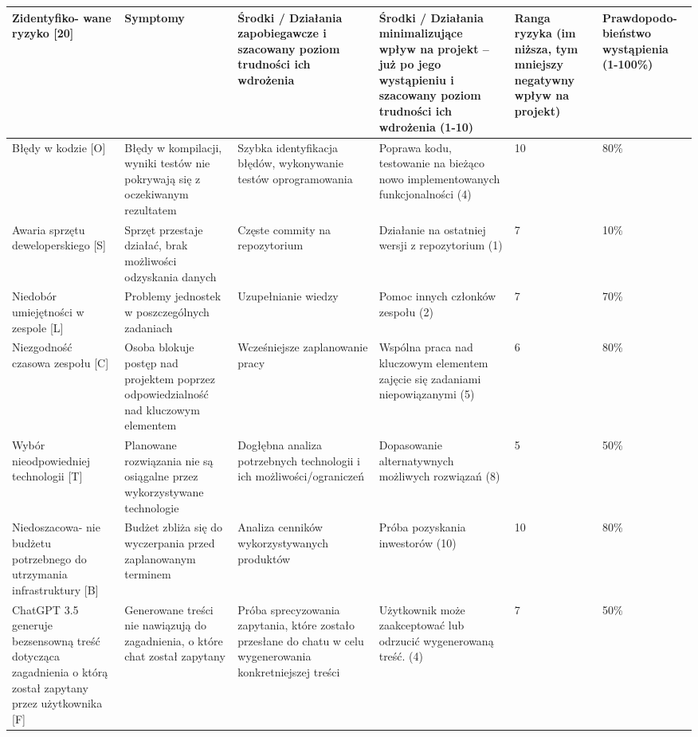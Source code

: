 \begin{longtable}{|p{2.3cm}|p{2.3cm}|p{2.3cm}|p{2.3cm}|p{2.3cm}|p{2.3cm}|}
    \hline
\textbf{Zidentyfiko- wane ryzyko [20]} & \textbf{Symptomy} & \textbf{Środki / Działania zapobiegawcze i szacowany poziom trudności ich wdrożenia} & \textbf{Środki / Działania minimalizujące wpływ na projekt – już po jego wystąpieniu i szacowany poziom trudności ich wdrożenia (1-10)} & \textbf{Ranga ryzyka (im niższa, tym mniejszy negatywny wpływ na projekt)} & \textbf{Prawdopodo- bieństwo wystąpienia (1-100\%)} \\
\hline
Błędy w kodzie [O] & Błędy w kompilacji, wyniki testów nie pokrywają się z oczekiwanym rezultatem  & Szybka identyfikacja błędów, wykonywanie testów oprogramowania & Poprawa kodu, testowanie na bieżąco nowo implementowanych funkcjonalności (4) & 10 & 80\% \\
\hline
Awaria sprzętu deweloperskiego [S] & Sprzęt przestaje działać, brak możliwości odzyskania danych & Częste commity na repozytorium & Działanie na ostatniej wersji z repozytorium (1) & 7 & 10\% \\
\hline
Niedobór umiejętności w zespole [L] & Problemy jednostek w poszczególnych zadaniach & Uzupełnianie wiedzy & Pomoc innych członków zespołu (2) & 7 & 70\% \\
\hline
Niezgodność czasowa zespołu [C]  & Osoba blokuje postęp nad projektem poprzez odpowiedzialność nad kluczowym elementem & Wcześniejsze zaplanowanie pracy & Wspólna praca nad kluczowym elementem zajęcie się zadaniami niepowiązanymi (5) & 6 & 80\% \\
\hline
Wybór nieodpowiedniej technologii [T] & Planowane rozwiązania nie są osiągalne przez wykorzystywane technologie & Dogłębna analiza potrzebnych technologii i ich możliwości/ograniczeń & Dopasowanie alternatywnych możliwych rozwiązań (8) & 5 & 50\% \\
\hline
Niedoszacowa- nie budżetu potrzebnego do utrzymania infrastruktury [B] & Budżet zbliża się do wyczerpania przed zaplanowanym terminem  & Analiza cenników wykorzystywanych produktów & Próba pozyskania inwestorów (10) & 10 & 80\% \\
\hline
ChatGPT 3.5 generuje bezsensowną treść dotycząca zagadnienia o którą został zapytany przez użytkownika [F] & Generowane treści nie nawiązują do zagadnienia, o które chat został zapytany & Próba sprecyzowania zapytania, które zostało przesłane do chatu w celu wygenerowania konkretniejszej treści & Użytkownik może zaakceptować lub odrzucić wygenerowaną treść. (4) & 7 & 50\% \\
\hline
\end{longtable}
